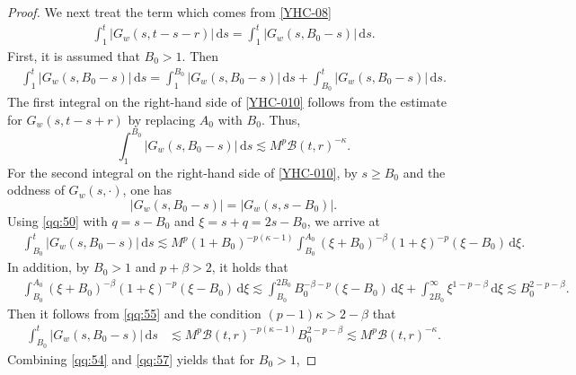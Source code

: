 \documentclass[11pt,twoside]{article}
\newcommand{\Bcal}{\mathcal B}
\newcommand{\dd}{\,\mathrm{d}}
\theoremstyle{plain}
\theoremstyle{definition}
\theoremstyle{remark}
\numberwithin{equation}{section}
\begin{document}
\begin{proof}
We next treat the term which comes from \eqref{YHC-08}
\begin{equation}\label{YHC-011}
\begin{aligned}
\int_1^t
|G_w(s,t-s-r)|\dd s
=
\int_1^t
|G_w(s,B_0-s)|\dd s.
\end{aligned}
\end{equation}
First, it is assumed that $B_0>1$. Then
\begin{equation}\label{YHC-010}
\begin{aligned}
\int_1^t
|G_w(s,B_0-s)|\dd s
=
\int_1^{B_0}
|G_w(s,B_0-s)|\dd s
+
\int_{B_0}^{t}
|G_w(s,B_0-s)|\dd s .
\end{aligned}
\end{equation}
The first integral on the right-hand side of \eqref{YHC-010} follows from the estimate for
$G_w(s,t-s+r)$ by replacing $A_0$ with $B_0$. Thus,
\begin{equation}
\label{qq:54}
\int_1^{B_0}
|G_w(s,B_0-s)|\dd s
\lesssim
M^p\Bcal(t,r)^{-\kappa}.
\end{equation}
For the second integral on the right-hand side of \eqref{YHC-010}, by $s\geq B_0$ and the oddness of
$G_w(s,\cdot)$, one has
\[
|G_w(s,B_0-s)|
=|G_w(s,s-B_0)|.
\]
Using \eqref{qq:50} with
$q=s-B_0$ and $\xi=s+q=2s-B_0$, we arrive at
\begin{equation}
\label{qq:55}
\begin{aligned}
&\int_{B_0}^{t}
|G_w(s,B_0-s)|\dd s\lesssim
M^p(1+B_0)^{-p(\kappa-1)}
\int_{B_0}^{A_0}
(\xi+B_0)^{-\beta}
(1+\xi)^{-p}
(\xi-B_0)\dd\xi.
\end{aligned}
\end{equation}
In addition, by $B_0>1$ and $p+\beta>2$, it holds that
\begin{equation}
\label{qq:56}
\begin{aligned}
&\int_{B_0}^{A_0}
(\xi+B_0)^{-\beta}
(1+\xi)^{-p}
(\xi-B_0)\dd\xi\lesssim
\int_{B_0}^{2B_0}
B_0^{-\beta-p}
(\xi-B_0)\dd\xi
+\int_{2B_0}^{\infty}
\xi^{1-p-\beta}\dd\xi\lesssim
B_0^{2-p-\beta}.
\end{aligned}
\end{equation}
Then it follows from \eqref{qq:55} and the condition $(p-1)\kappa>2-\beta$ that
\begin{equation}
\label{qq:57}
\begin{aligned}
\int_{B_0}^{t}
|G_w(s,B_0-s)|\dd s
&\lesssim
M^p
\Bcal(t,r)^{-p(\kappa-1)}
B_0^{2-p-\beta}\lesssim
M^p\Bcal(t,r)^{-\kappa}.
\end{aligned}
\end{equation}
Combining \eqref{qq:54} and \eqref{qq:57} yields that for $B_0>1$,

\end{proof}
\end{document}

